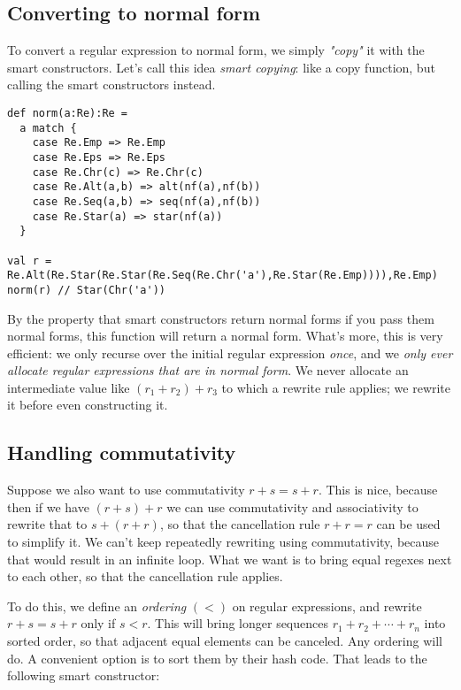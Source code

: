 \subsection{Converting to normal form}

To convert a regular expression to normal form, we simply \emph{"copy"} it with the smart constructors.
Let's call this idea \emph{smart copying}: like a copy function, but calling the smart constructors instead.

\begin{lstlisting}
def norm(a:Re):Re =
  a match {
    case Re.Emp => Re.Emp
    case Re.Eps => Re.Eps
    case Re.Chr(c) => Re.Chr(c)
    case Re.Alt(a,b) => alt(nf(a),nf(b))
    case Re.Seq(a,b) => seq(nf(a),nf(b))
    case Re.Star(a) => star(nf(a))
  }

val r = Re.Alt(Re.Star(Re.Star(Re.Seq(Re.Chr('a'),Re.Star(Re.Emp)))),Re.Emp)
norm(r) // Star(Chr('a'))
\end{lstlisting}

By the property that smart constructors return normal forms if you pass them normal forms, this function will return a normal form. What's more, this is very efficient: we only recurse over the initial regular expression \emph{once}, and we \emph{only ever allocate regular expressions that are in normal form}. We never allocate an intermediate value like $(r_1 + r_2) + r_3$ to which a rewrite rule applies; we rewrite it before even constructing it.

\subsection{Handling commutativity}

Suppose we also want to use commutativity $r + s = s + r$. This is nice, because then if we have $(r + s) + r$ we can use commutativity and associativity to rewrite that to $s + (r + r)$, so that the cancellation rule $r + r = r$ can be used to simplify it. We can't keep repeatedly rewriting using commutativity, because that would result in an infinite loop. What we want is to bring equal regexes next to each other, so that the cancellation rule applies.

To do this, we define an \emph{ordering} $(<)$ on regular expressions, and rewrite $r + s = s + r$ only if $s < r$. This will bring longer sequences $r_1 + r_2 + \cdots + r_n$ into sorted order, so that adjacent equal elements can be canceled. Any ordering will do. A convenient option is to sort them by their hash code. That leads to the following smart constructor:

